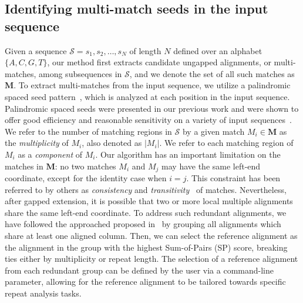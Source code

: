 \documentclass[9.5pt,journal,final,finalsubmission,twocolumn]{IEEEtran}
\begin{document}
\subsection{Identifying multi-match seeds in the input sequence}
Given a sequence $\mathcal{S}=s_1, s_2,\dots, s_N$ of length $N$
defined over an alphabet $\{A,C,G,T\}$, our method first extracts candidate ungapped
alignments, or multi-matches, among subsequences in $\mathcal{S}$,
and we denote the set of all such matches as $\mathbf{M}$. To extract multi-matches from the input
sequence, we utilize a palindromic spaced seed pattern~\cite{ref-zhang}, which is
analyzed at each position in the input sequence.
Palindromic spaced seeds were presented in our previous work and were shown to offer good efficiency and
reasonable sensitivity on a variety of input
sequences~\cite{ref-procrast}.  We refer to the number of matching regions
in $\mathcal{S}$ by a given match $M_i \in \mathbf{M}$ as the
\textit{multiplicity} of $M_i$, also denoted as $|M_i|$. We refer to each
matching region of $M_i$ as a \textit{component} of $M_i$. Our
algorithm has an important limitation on the matches in $\mathbf{M}$:
no two matches $M_i$ and $M_j$ may have the same left-end coordinate,
except for the identity case when $i=j$.  This constraint has been
referred to by others as \textit{consistency} and
\textit{transitivity}~\cite{ref-transitivity} of matches. Nevertheless,
after gapped extension, it is possible that two or more
local multiple alignments share the same left-end coordinate. To address such redundant alignments, we have followed
the approached proposed in~\cite{ref-related1} by grouping all alignments which share at least one aligned column. Then, we can select the reference alignment
as the alignment in the group with the highest Sum-of-Pairs (SP) score, breaking ties either by multiplicity or repeat length. The selection of a reference alignment from each redundant group can be defined by the user via a command-line parameter, allowing for the reference alignment to be tailored towards specific repeat analysis tasks.
\end{document}
